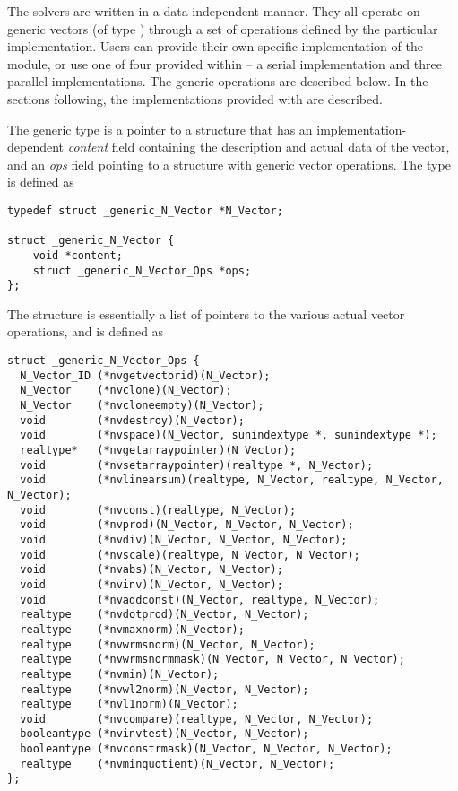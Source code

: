 %
The {\sundials} solvers are written in a data-independent manner. 
They all operate on generic vectors (of type ) through a set of
operations defined by the particular {\nvector} implementation.
Users can provide their own specific implementation of the {\nvector} module,
or use one of four provided within {\sundials} -- a serial implementation and
three parallel implementations.  The generic operations are described below.
In the sections following, the implementations provided with {\sundials}
are described.

The generic  type is a pointer to a structure that has an 
implementation-dependent {\em content} field containing the 
description and actual data of the vector, and an {\em ops} field 
pointing to a structure with generic vector operations.
The type  is defined as
\begin{verbatim}
typedef struct _generic_N_Vector *N_Vector;

struct _generic_N_Vector {
    void *content;
    struct _generic_N_Vector_Ops *ops;
};
\end{verbatim}
The  structure is essentially a list of pointers to
the various actual vector operations, and is defined as
\begin{verbatim}
struct _generic_N_Vector_Ops {
  N_Vector_ID (*nvgetvectorid)(N_Vector);
  N_Vector    (*nvclone)(N_Vector);
  N_Vector    (*nvcloneempty)(N_Vector);
  void        (*nvdestroy)(N_Vector);
  void        (*nvspace)(N_Vector, sunindextype *, sunindextype *);
  realtype*   (*nvgetarraypointer)(N_Vector);
  void        (*nvsetarraypointer)(realtype *, N_Vector);
  void        (*nvlinearsum)(realtype, N_Vector, realtype, N_Vector, N_Vector); 
  void        (*nvconst)(realtype, N_Vector);
  void        (*nvprod)(N_Vector, N_Vector, N_Vector);
  void        (*nvdiv)(N_Vector, N_Vector, N_Vector);
  void        (*nvscale)(realtype, N_Vector, N_Vector);
  void        (*nvabs)(N_Vector, N_Vector);
  void        (*nvinv)(N_Vector, N_Vector);
  void        (*nvaddconst)(N_Vector, realtype, N_Vector);
  realtype    (*nvdotprod)(N_Vector, N_Vector);
  realtype    (*nvmaxnorm)(N_Vector);
  realtype    (*nvwrmsnorm)(N_Vector, N_Vector);
  realtype    (*nvwrmsnormmask)(N_Vector, N_Vector, N_Vector);
  realtype    (*nvmin)(N_Vector);
  realtype    (*nvwl2norm)(N_Vector, N_Vector);
  realtype    (*nvl1norm)(N_Vector);
  void        (*nvcompare)(realtype, N_Vector, N_Vector);
  booleantype (*nvinvtest)(N_Vector, N_Vector);
  booleantype (*nvconstrmask)(N_Vector, N_Vector, N_Vector);
  realtype    (*nvminquotient)(N_Vector, N_Vector);
};
\end{verbatim}




